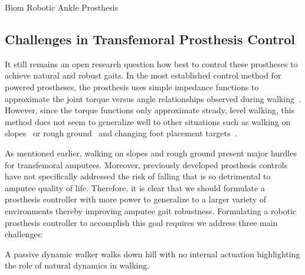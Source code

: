 \begin{marginfigure}[-1in]
    \centering
    \caption{Biom Robotic Ankle Prosthesis}
    \label{fig:biom_ankle}
\end{marginfigure}


\subsection{Challenges in Transfemoral Prosthesis
Control}\label{sec:intro_challenges} 

It still remains an open research question how best to control these prostheses
to achieve natural and robust gaits. In the most established control method for
powered prostheses, the prosthesis uses simple impedance functions to
approximate the joint torque versus angle relationships observed during
walking~\citep{sup2009preliminary}. However, since the torque functions only
approximate steady, level walking, this method does not seem to generalize well
to other situations such as walking on slopes~\citep{sup2011upslope} or rough
ground~\citep{thatte2016toward} and changing foot placement
targets~\citep{schepelmann2016evaluation}. 

As mentioned earlier, walking on slopes and rough ground present major hurdles
for transfemoral amputees. Moreover, previously developed prosthesis controls
have not specifically addressed the risk of falling that is so detrimental to
amputee quality of life. Therefore, it is clear that we should formulate a
prosthesis controller with more power to generalize to a larger variety of
environments thereby improving amputee gait robustness. Formulating a robotic
prosthesis controller to accomplish this goal requires we address three main
challenges:

\begin{marginfigure}
    \centering
    \caption{A passive dynamic walker walks down hill with no internal
    actuation highlighting the role of natural dynamics in walking.}
    \label{fig:passive_dynamic_walker}
\end{marginfigure}

